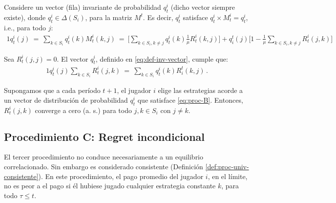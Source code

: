 Considere un vector (fila) invariante de probabilidad $q^i_t$ (dicho vector siempre existe), donde $q^i_t\in \Delta(S_i)$, para la matriz $M^t$. Es decir, $q^i_t$ satisface $q^i_t \times M^i_t = q^i_t$, i.e., para todo $j$:
\begin{alignat}{1}
\label{eq:def-inv-vector}
  q^i_t(j)\ 
    =\ \sum_{k\in S_i} q^i_t(k) M^i_t(k,j)\ 
    =\ \bigg[\sum_{k \in S_i, k \neq j} q^i_t(k)\frac{1}{\mu}R^i_t(k,j)\bigg] + q_i^t(j)\biggl[1 - \frac{1}{\mu}\sum_{k \in S_i, k \neq j} R^i_t(j,k)\biggr]
\end{alignat}

\begin{theorem}
\label{theo:def-proc-B}
Sea $R_t^i(j, j) = 0$. El vector $q_t^i$, definido en \ref{eq:def-inv-vector}, cumple que:
\begin{alignat}{1}
\label{eq:proc-B}
q^i_t(j)\sum_{k \in S_i} R^i_t(j,k)\ =\ \sum_{k \in S_i} q_t^i(k)R_i^t(k,j) \,.
\end{alignat}
\end{theorem}

\begin{theorem}
\label{theo:conv-proc-B}
Supongamos que a cada período $t+1$, el jugador $i$ elige las estrategias acorde a un vector de distribución de probabilidad $q_t^i$ que satisface \eqref{eq:proc-B}. Entonces, $R^i_t(j, k)$ converge a cero (a. s.) para todo $j, k \in S_i$ con $j \neq k$.
\end{theorem}

\subsection*{Procedimiento C: Regret incondicional}

El tercer procedimiento no conduce necesariamente a un equilibrio correlacionado. Sin embargo es considerado  consistente (Definición \ref{def:proc-univ-consistente}). En este procedimiento, el pago promedio del jugador $i$, en el límite, no es peor a el pago si él hubiese jugado cualquier estrategia constante $k$, para todo $\tau \leq t$.


